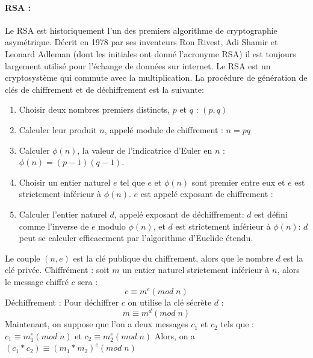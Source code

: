 \documentclass[a4paper,12pt]{article}
\begin{document}
\paragraph{RSA :}
Le RSA est historiquement l'un des premiers  algorithme de cryptographie asymétrique. Décrit en 1978 par ses inventeurs Ron Rivest, Adi Shamir et Leonard Adleman (dont les initiales ont donné l'acronyme RSA) il est toujours largement utilisé pour l'échange de données sur internet. Le RSA est un cryptosystème qui commute avec la multiplication.\newline
La procédure de génération de clés de chiffrement et de déchiffrement est la suivante:
\begin{enumerate}
\item Choisir deux nombres premiers distincts,  $p$ et $q$ : $(p,q)$
\item Calculer leur produit $n$, appelé module de chiffrement : $n = pq$
\item Calculer $\phi(n)$, la valeur de l'indicatrice d'Euler en $n$ : $\phi(n) = (p - 1)(q -1)$.
\item Choisir un entier naturel $e$ tel que $e$ et $\phi(n)$ sont  premier entre eux et $e$ est strictement inférieur à $\phi(n)$. $e$ est appelé exposant de chiffrement :
\item Calculer l'entier naturel $d$, appelé exposant de déchiffrement:
$d$ est défini comme l'inverse de $e$ modulo $\phi(n)$, et $d$ est strictement inférieur à $\phi(n)$:
$d$ peut se calculer efficacement par l'algorithme d'Euclide étendu.
\end{enumerate}
Le couple $(n,e)$ est la clé publique du chiffrement, alors que le nombre $d$ est la clé privée.\newline
Chiffrément :\newline 
soit $m$ un entier naturel strictement inférieur à $n$, alors le message chiffré $c$ sera :\newline
$$c \equiv m^e(mod\; n)$$
Déchiffrement :\newline
Pour déchiffrer $c$ on utilise la clé sécrète $d$ :\newline
$$m \equiv m^d(mod\; n)$$
Maintenant, on suppose que l'on a deux messages $c_1$ et $c_2$ tels que :
$c_1 \equiv m_1^e(mod\; n)$ et $c_2 \equiv m_2^e(mod\; n)$ \newline
Alors, on a $(c_1*c_2) \equiv (m_1*m_2)^e(mod\; n)$\newline
\newline
\end{document}
